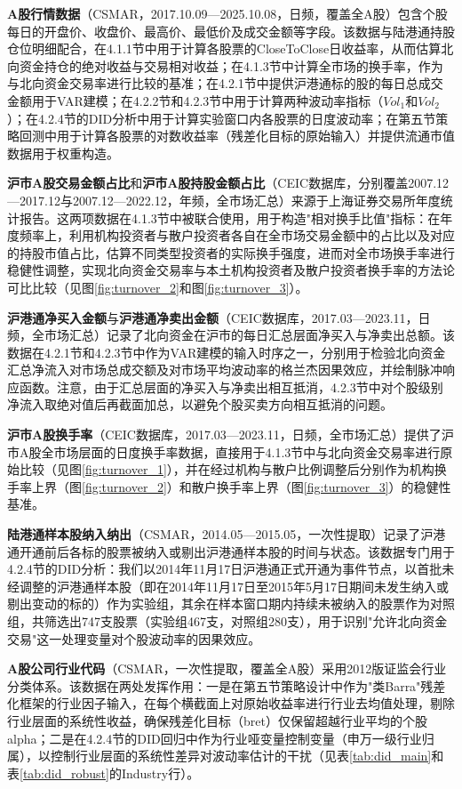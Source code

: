 \documentclass{article}
\begin{document}
\textbf{A股行情数据}（CSMAR，2017.10.09—2025.10.08，日频，覆盖全A股）包含个股每日的开盘价、收盘价、最高价、最低价及成交金额等字段。该数据与陆港通持股仓位明细配合，在4.1.1节中用于计算各股票的CloseToClose日收益率，从而估算北向资金持仓的绝对收益与交易相对收益；在4.1.3节中计算全市场的换手率，作为与北向资金交易率进行比较的基准；在4.2.1节中提供沪港通标的股的每日总成交金额用于VAR建模；在4.2.2节和4.2.3节中用于计算两种波动率指标（$Vol_1$和$Vol_2$）；在4.2.4节的DID分析中用于计算实验窗口内各股票的日度波动率；在第五节策略回测中用于计算各股票的对数收益率（残差化目标的原始输入）并提供流通市值数据用于权重构造。

\textbf{沪市A股交易金额占比}和\textbf{沪市A股持股金额占比}（CEIC数据库，分别覆盖2007.12—2017.12与2007.12—2022.12，年频，全市场汇总）来源于上海证券交易所年度统计报告。这两项数据在4.1.3节中被联合使用，用于构造"相对换手比值"指标：在年度频率上，利用机构投资者与散户投资者各自在全市场交易金额中的占比以及对应的持股市值占比，估算不同类型投资者的实际换手强度，进而对全市场换手率进行稳健性调整，实现北向资金交易率与本土机构投资者及散户投资者换手率的方法论可比比较（见图\ref{fig:turnover_2}和图\ref{fig:turnover_3}）。

\textbf{沪港通净买入金额}与\textbf{沪港通净卖出金额}（CEIC数据库，2017.03—2023.11，日频，全市场汇总）记录了北向资金在沪市的每日汇总层面净买入与净卖出总额。该数据在4.2.1节和4.2.3节中作为VAR建模的输入时序之一，分别用于检验北向资金汇总净流入对市场总成交额及对市场平均波动率的格兰杰因果效应，并绘制脉冲响应函数。注意，由于汇总层面的净买入与净卖出相互抵消，4.2.3节中对个股级别净流入取绝对值后再截面加总，以避免个股买卖方向相互抵消的问题。

\textbf{沪市A股换手率}（CEIC数据库，2017.03—2023.11，日频，全市场汇总）提供了沪市A股全市场层面的日度换手率数据，直接用于4.1.3节中与北向资金交易率进行原始比较（见图\ref{fig:turnover_1}），并在经过机构与散户比例调整后分别作为机构换手率上界（图\ref{fig:turnover_2}）和散户换手率上界（图\ref{fig:turnover_3}）的稳健性基准。

\textbf{陆港通样本股纳入纳出}（CSMAR，2014.05—2015.05，一次性提取）记录了沪港通开通前后各标的股票被纳入或剔出沪港通样本股的时间与状态。该数据专门用于4.2.4节的DID分析：我们以2014年11月17日沪港通正式开通为事件节点，以首批未经调整的沪港通样本股（即在2014年11月17日至2015年5月17日期间未发生纳入或剔出变动的标的）作为实验组，其余在样本窗口期内持续未被纳入的股票作为对照组，共筛选出747支股票（实验组467支，对照组280支），用于识别"允许北向资金交易"这一处理变量对个股波动率的因果效应。

\textbf{A股公司行业代码}（CSMAR，一次性提取，覆盖全A股）采用2012版证监会行业分类体系。该数据在两处发挥作用：一是在第五节策略设计中作为"类Barra"残差化框架的行业因子输入，在每个横截面上对原始收益率进行行业去均值处理，剔除行业层面的系统性收益，确保残差化目标（bret）仅保留超越行业平均的个股alpha；二是在4.2.4节的DID回归中作为行业哑变量控制变量（申万一级行业归属），以控制行业层面的系统性差异对波动率估计的干扰（见表\ref{tab:did_main}和表\ref{tab:did_robust}的Industry行）。
\end{document}
